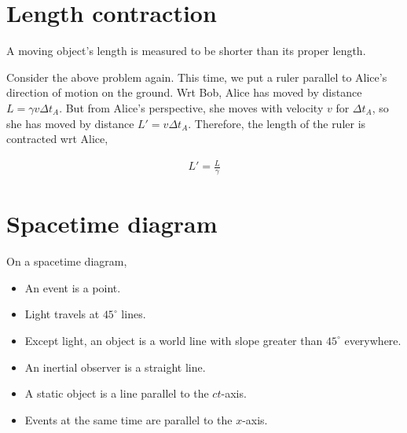 \documentclass[12pt]{book} %
\numberwithin{equation}{chapter}
\def\c{\gamma}
\def\D{\Delta}
\begin{document}
\section{Length contraction}
A moving object's length is measured to be shorter than its proper length.
\begin{example}
Consider the above problem again. This time, we put a ruler parallel to Alice's direction of motion on the ground. Wrt Bob, Alice has moved by distance $L=\c v\D t_{A}$. But from Alice's perspective, she moves with velocity $v$ for $\D t_{A}$, so she has moved by distance $L'=v\D t_{A}$. Therefore, the length of the ruler is contracted wrt Alice,
\begin{eqnbox}
\begin{align}
L'=\frac{L}{\c}
\end{align}
\end{eqnbox}
\end{example}

\section{Spacetime diagram}
On a spacetime diagram,
\begin{itembox}
\begin{itemize}
\item An event is a point.
\item Light travels at $45^\circ$ lines.
\item Except light, an object is a world line with slope greater than $45^\circ$ everywhere.
\item An inertial observer is a straight line.
\item A static object is a line parallel to the $ct$-axis.
\item Events at the same time are parallel to the $x$-axis.
\end{itemize}
\end{itembox}
\end{document}
